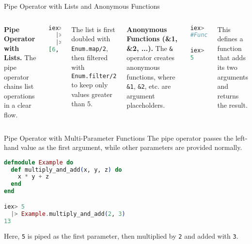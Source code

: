 \documentclass[aspectratio=169, table]{beamer}
\begin{document}
\begin{frame}[fragile]{Pipe Operator with Lists and Anonymous Functions}
\vspace{20pt}
\begin{columns}[t]

\textbf{Pipe Operator with Lists.}  
The pipe operator chains list operations in a clear flow.

\begin{lstlisting}[language=Elixir]
iex> [1, 2, 3, 4, 5]
  |> Enum.map(&(&1 * 2))
  |> Enum.filter(&(&1 > 5))
[6, 8, 10]
\end{lstlisting}

The list is first doubled with \texttt{Enum.map/2},  
then filtered with \texttt{Enum.filter/2} to  
keep only values greater than 5.

\textbf{Anonymous Functions (\&1, \&2, ...).}  
The \texttt{\&} operator creates anonymous functions,  
where \texttt{\&1}, \texttt{\&2}, etc. are argument placeholders.

\begin{lstlisting}[language=Elixir]
iex> add = &(&1 + &2)
#Function<.../2 in :erl_eval.expr/5>

iex> add.(2, 3)
5
\end{lstlisting}

This defines a function that adds its  
two arguments and returns the result.
\end{columns}
\end{frame}

\begin{frame}[fragile]{Pipe Operator with Multi-Parameter Functions}
\vspace{20pt}
The pipe operator passes the left-hand value as the first argument,  
while other parameters are provided normally.

\begin{lstlisting}[language=Elixir]
defmodule Example do
  def multiply_and_add(x, y, z) do
    x * y + z
  end
end

iex> 5
  |> Example.multiply_and_add(2, 3)
13
\end{lstlisting}

Here, \texttt{5} is piped as the first parameter,  
then multiplied by \texttt{2} and added with \texttt{3}.
\end{frame}
\end{document}
